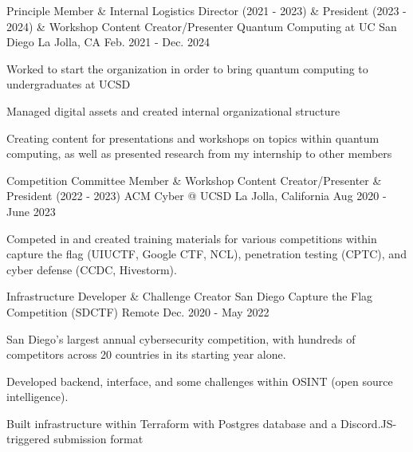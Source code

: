

\begin{cventries}

  \cventry
    {Principle Member \& Internal Logistics Director (2021 - 2023) \& President (2023 - 2024) \& Workshop Content Creator/Presenter} %
    {Quantum Computing at UC San Diego} %
    {La Jolla, CA} %
    {Feb. 2021 - Dec. 2024} %
    {
      \begin{cvitems} %
        \item {Worked to start the organization in order to bring quantum computing to undergraduates at UCSD}
        \item {Managed digital assets and created internal organizational structure}
        \item {Creating content for presentations and workshops on topics within quantum computing, as well as presented research from my internship to other members}
      \end{cvitems}
    }
    


  \cventry
    {Competition Committee Member \& Workshop Content Creator/Presenter \& President (2022 - 2023)} %
    {ACM Cyber @ UCSD} %
    {La Jolla, California} %
    {Aug 2020 - June 2023} %
    {
      \begin{cvitems} %
        \item {Competed in and created training materials for various competitions within capture the flag (UIUCTF, Google CTF, NCL), penetration testing (CPTC), and cyber defense (CCDC, Hivestorm).}
      \end{cvitems}
    }

  \cventry
    {Infrastructure Developer \& Challenge Creator}
    {San Diego Capture the Flag Competition (SDCTF)}
    {Remote}
    {Dec. 2020 - May 2022}
    {
      \begin{cvitems}
          \item{San Diego’s largest annual cybersecurity competition, with hundreds of competitors across 20 countries in its starting year alone.}
          \item {Developed backend, interface, and some challenges within OSINT (open source intelligence).}
          \item {Built infrastructure within Terraform with Postgres database and a Discord.JS-triggered submission format}
      \end{cvitems}
    }
\end{cventries}